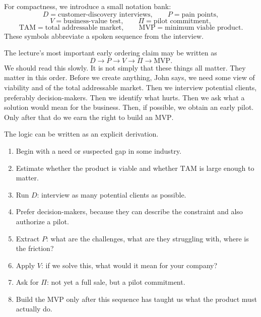 \begin{definition}
For compactness, we introduce a small notation bank:
\[
D = \text{customer-discovery interviews},\qquad
P = \text{pain points},
\]
\[
V = \text{business-value test},\qquad
\Pi = \text{pilot commitment},
\]
\[
\mathrm{TAM} = \text{total addressable market},\qquad
\mathrm{MVP} = \text{minimum viable product}.
\]
These symbols abbreviate a spoken sequence from the interview.
\end{definition}

The lecture's most important early ordering claim may be written as
\begin{equation}
D \rightarrow P \rightarrow V \rightarrow \Pi \rightarrow \mathrm{MVP}.
\end{equation}
We should read this slowly. It is not simply that these things all matter. They matter in this order. Before we create anything, John says, we need some view of viability and of the total addressable market. Then we interview potential clients, preferably decision-makers. Then we identify what hurts. Then we ask what a solution would mean for the business. Then, if possible, we obtain an early pilot. Only after that do we earn the right to build an \(\mathrm{MVP}\).

The logic can be written as an explicit derivation.
\begin{enumerate}
\item Begin with a need or suspected gap in some industry.
\item Estimate whether the product is viable and whether \(\mathrm{TAM}\) is large enough to matter.
\item Run \(D\): interview as many potential clients as possible.
\item Prefer decision-makers, because they can describe the constraint and also authorize a pilot.
\item Extract \(P\): what are the challenges, what are they struggling with, where is the friction?
\item Apply \(V\): if we solve this, what would it mean for your company?
\item Ask for \(\Pi\): not yet a full sale, but a pilot commitment.
\item Build the \(\mathrm{MVP}\) only after this sequence has taught us what the product must actually do.
\end{enumerate}

